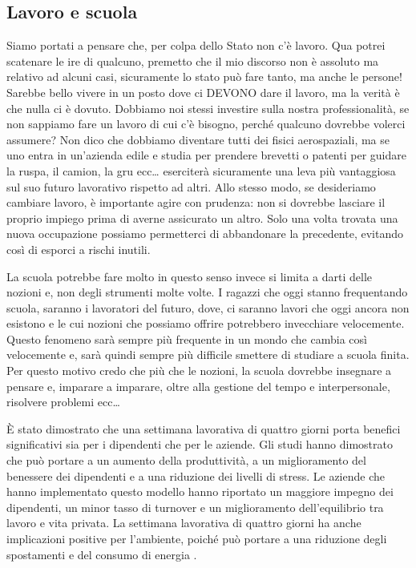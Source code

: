 \documentclass[12pt]{book} %
\begin{document}
\subsection{Lavoro e scuola}
Siamo portati a pensare che, per colpa dello Stato non
c'è lavoro. Qua potrei scatenare le ire di qualcuno, premetto che il mio discorso non è assoluto
ma relativo ad alcuni casi, sicuramente lo stato può fare tanto, ma anche le persone! Sarebbe bello vivere in un posto
dove ci DEVONO dare il lavoro, ma la verità è che nulla ci è dovuto. Dobbiamo noi stessi investire sulla nostra
professionalità, se non sappiamo fare un lavoro di cui c'è bisogno, perché qualcuno dovrebbe volerci assumere? 
Non dico che dobbiamo
diventare tutti dei fisici aerospaziali, ma se uno entra in un'azienda edile e studia per prendere
brevetti o patenti per guidare la ruspa, il camion, la gru ecc… eserciterà sicuramente una leva più vantaggiosa sul suo
futuro lavorativo rispetto ad altri. 
Allo stesso modo, se desideriamo cambiare lavoro, è importante agire con prudenza: non si dovrebbe lasciare il proprio impiego prima di averne assicurato un altro. Solo una volta trovata una nuova occupazione possiamo permetterci di abbandonare la precedente, evitando così di esporci a rischi inutili.

La scuola potrebbe fare molto in questo senso invece si
limita a darti delle nozioni e, non degli strumenti molte volte. I ragazzi che oggi stanno frequentando scuola, saranno
i lavoratori del futuro, dove, ci saranno lavori che oggi ancora non esistono e le cui nozioni che possiamo offrire potrebbero invecchiare velocemente. Questo fenomeno sarà sempre più frequente in un mondo che cambia così velocemente e, sarà quindi sempre più difficile smettere di studiare a scuola finita. Per questo motivo credo che più che le nozioni, la scuola dovrebbe insegnare a pensare e, imparare a imparare, oltre alla gestione del tempo e interpersonale, risolvere problemi ecc… 

\begin{mdframed}[linewidth=1pt]
È stato dimostrato che una settimana lavorativa di quattro giorni porta benefici significativi sia per i dipendenti che per le aziende. Gli studi hanno dimostrato che può portare a un aumento della produttività, a un miglioramento del benessere dei dipendenti e a una riduzione dei livelli di stress. Le aziende che hanno implementato questo modello hanno riportato un maggiore impegno dei dipendenti, un minor tasso di turnover e un miglioramento dell'equilibrio tra lavoro e vita privata. La settimana lavorativa di quattro giorni ha anche implicazioni positive per l'ambiente, poiché può portare a una riduzione degli spostamenti e del consumo di energia .
\end{mdframed}
\end{document}
